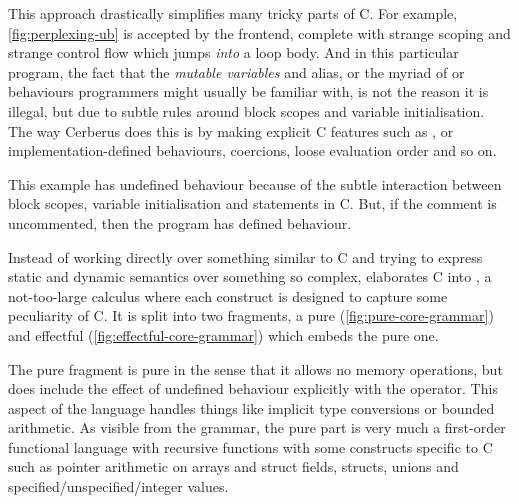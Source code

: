 This approach drastically simplifies many tricky parts of C. For example,
\cref{fig:perplexing-ub} is accepted by the frontend, complete with strange
scoping and strange control flow which jumps \emph{into} a loop body. And in
this particular program, the fact that the \emph{mutable variables} 
and  alias, or the myriad of  or 
behaviours programmers might usually be familiar with, is not the reason it is
illegal, but due to subtle rules around block scopes and variable
initialisation. The way Cerberus does this is by making explicit C features
such as ,  or implementation-defined behaviours,
coercions, loose evaluation order and so on.

\begin{marginfigure}
    \caption{This example has undefined behaviour because of the subtle
        interaction between block scopes, variable initialisation and
         statements in C. But, if the comment is uncommented,
        then the program has defined behaviour.}\label{fig:perplexing-ub}
\end{marginfigure}

Instead of working directly over something similar to C and trying to express
static and dynamic semantics over something so complex, 
elaborates C into , a not-too-large calculus where each construct
is designed to capture some peculiarity of C. It is split into two fragments, a
pure (\cref{fig:pure-core-grammar}) and effectful
(\cref{fig:effectful-core-grammar}) which embeds the pure one.

The pure fragment is pure in the sense that it allows no memory operations, but does
include the effect of undefined behaviour explicitly with the
 operator. This aspect of the language handles %
things like implicit type conversions or bounded arithmetic. As visible from the
grammar, the pure part is very much a first-order functional language with
recursive functions with some constructs specific to C such as pointer
arithmetic on arrays and struct fields, structs, unions and
specified/unspecified/integer values.

